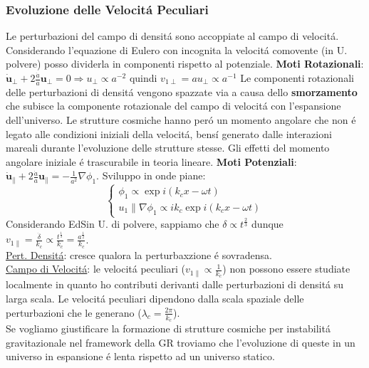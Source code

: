 \documentclass[12pt, a4paper]{article}
\begin{document}
\subsubsection{Evoluzione delle Velocit\'{a} Peculiari}
Le perturbazioni del campo di densit\'{a} sono accoppiate al campo di velocit\'{a}. Considerando l'equazione di Eulero con incognita la velocit\'{a} comovente (in U. polvere) posso dividerla in componenti rispetto al potenziale.
\textbf{Moti Rotazionali}: $\dot{\textbf{u}}_{\perp}+2\frac{\dot{a}}{a}\textbf{u}_{\perp}=0 \Rightarrow u _{\perp}\propto a^{-2}$ quindi $v_{1\perp}= a u _{\perp}\propto a^{-1}$ 
Le componenti rotazionali delle perturbazioni di densit\'{a} vengono spazzate via a causa dello \textbf{smorzamento} che subisce la componente rotazionale del campo di velocit\'{a} con l'espansione dell'universo. Le strutture cosmiche hanno per\'{o} un momento angolare che non \'{e} legato alle condizioni iniziali della velocit\'{a}, bens\'{i} generato dalle interazioni mareali durante l'evoluzione delle strutture stesse. Gli effetti del momento angolare iniziale \'{e} trascurabile in teoria lineare.
\textbf{Moti Potenziali}: $\dot{\textbf{u}}_{\parallel}+2\frac{\dot{a}}{a}\textbf{u}_{\parallel}=-\frac{1}{a^2}\nabla\phi_1$. Sviluppo in onde piane:
\begin{equation}
\begin{cases}
\phi_1 \propto \exp{i(k_cx-\omega t)}
\\
u_1 \parallel \nabla\phi_1 \propto i k_c \exp{i(k_cx-\omega t)}
\end{cases}
\end{equation}
Considerando EdSin U. di polvere, sappiamo che $\delta\propto t^{\frac{2}{3}}$ dunque $v_{1\parallel} =\frac{\dot{\delta}}{k_c} \propto \frac{t^{\frac{1}{3}}}{k_c}=\frac{a^{\frac{1}{2}}}{k_c}$.\\
\underline{Pert. Densit\'{a}}: cresce qualora la perturbaxzione \'{e} sovradensa.\\
\underline{Campo di Velocit\'{a}}: le velocit\'{a} peculiari ($v_{1\parallel}\propto \frac{1}{k_c}$) non possono essere studiate localmente in quanto ho contributi derivanti dalle perturbazioni di densit\'{a} su larga scala. Le velocit\'{a} peculiari dipendono dalla scala spaziale delle perturbazioni che le generano ($\lambda_c=\frac{2\pi}{k_c}$).\\ 
Se vogliamo giustificare la formazione di strutture cosmiche per instabilit\'{a} gravitazionale nel framework della GR troviamo che l'evoluzione di queste in un universo in espansione \'{e} lenta rispetto ad un universo statico.
\end{document}
